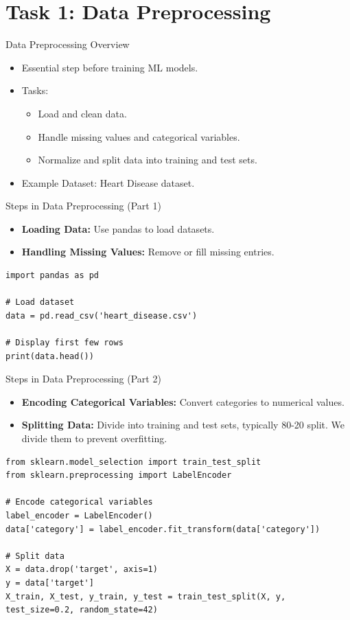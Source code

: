 \documentclass{beamer}
\begin{document}
\section{Task 1: Data Preprocessing}

\begin{frame}{Data Preprocessing Overview}
\begin{itemize}
    \item Essential step before training ML models.
    \item Tasks:
    \begin{itemize}
        \item Load and clean data.
        \item Handle missing values and categorical variables.
        \item Normalize and split data into training and test sets.
    \end{itemize}
    \item Example Dataset: Heart Disease dataset.
\end{itemize}
\end{frame}

\begin{frame}[fragile]{Steps in Data Preprocessing (Part 1)}
\begin{itemize}
    \item \textbf{Loading Data:} Use pandas to load datasets.
    \item \textbf{Handling Missing Values:} Remove or fill missing entries.
\end{itemize}
\begin{lstlisting}
import pandas as pd

# Load dataset
data = pd.read_csv('heart_disease.csv')

# Display first few rows
print(data.head())
\end{lstlisting}
\end{frame}

\begin{frame}[fragile]{Steps in Data Preprocessing (Part 2)}
\begin{itemize}
    \item \textbf{Encoding Categorical Variables:} Convert categories to numerical values.
    \item \textbf{Splitting Data:} Divide into training and test sets, typically 80-20 split. We divide them to prevent overfitting.
\end{itemize}
\begin{lstlisting}
from sklearn.model_selection import train_test_split
from sklearn.preprocessing import LabelEncoder

# Encode categorical variables
label_encoder = LabelEncoder()
data['category'] = label_encoder.fit_transform(data['category'])

# Split data
X = data.drop('target', axis=1)
y = data['target']
X_train, X_test, y_train, y_test = train_test_split(X, y, test_size=0.2, random_state=42)
\end{lstlisting}
\end{frame}
\end{document}
